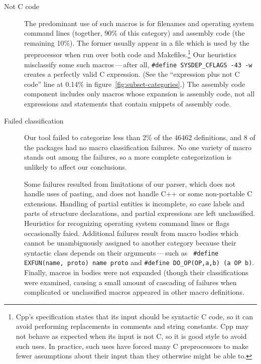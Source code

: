 \begin{description}
\item[Not C code]\label{page:not-c-code}
  The predominant use of such macros is for filenames and operating system
  command lines (together, 90\% of this category) and assembly code (the
  remaining 10\%).  The former usually appear in a file which is used by
  the preprocessor when run over both code and Makefiles.\footnote{Cpp's
    specification states that its input should be syntactic C code, so it
    can avoid performing replacements in comments and string constants.
    Cpp may not behave as expected when its input is not C, so it is good
    style to avoid such uses.  In practice, such uses have forced many C
    preprocessors to make fewer assumptions about their input than they
    otherwise might be able to.}  Our heuristics misclassify some such
  macros\,---\,after all, {\tt \#define \verb|SYSDEP_CFLAGS| -43 -w}
  creates a perfectly valid C expression.  (See the ``expression plus not C
  code'' line at 0.14\% in figure~\ref{fig:subset-categories}.)  The
  assembly code component includes only macros whose expansion is assembly
  code, not all expressions and statements that contain snippets of
  assembly code.

\item[Failed classification]
  Our tool failed to categorize less than 2\% of the 46462 definitions, and
  8 of the {\numpackages} packages had no macro classification failures.
  No one variety of macro stands out among the failures, so a more complete
  categorization is unlikely to affect our conclusions.
  
  Some failures resulted from limitations of our parser, which does not
  handle uses of pasting, and does not handle C++ or some non-portable C
  extensions.  Handling of partial entities is incomplete, so case labels
  and parts of structure declarations, and partial expressions are left
  unclassified.  Heuristics for recognizing operating system command lines
  or flags occasionally faied.  Additional failures result from macro
  bodies which cannot be unambiguously assigned to another category because
  their syntactic class depends on their arguments\,---\,such as {\tt
  \#define EXFUN(name, proto) name proto} and {\tt \#define
\verb|DO_OP|(OP,a,b) (a OP b)}.  Finally, macros in bodies were not
expanded (though their classifications were examined, causing a small
amount of cascading of failures when complicated or unclassified macros
appeared in other macro definitions.

\end{description}

